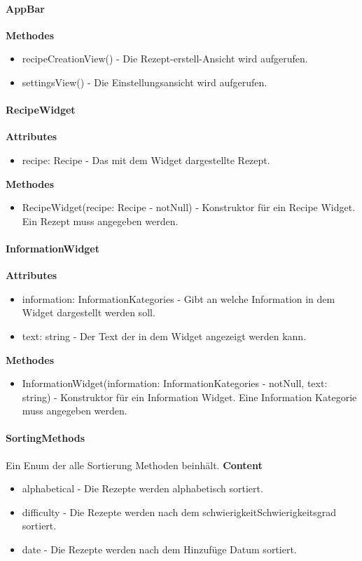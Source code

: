\documentclass[parskip=full]{scrartcl}
\begin{document}
\paragraph{AppBar}
\textbf{Methodes}
\begin{itemize}
    \item recipeCreationView() - Die Rezept-erstell-Ansicht wird aufgerufen.
    \item settingsView() - Die Einstellungsansicht wird aufgerufen.
\end{itemize}

\paragraph{RecipeWidget}
\textbf{Attributes}
\begin{itemize}
    \item recipe: Recipe - Das mit dem Widget dargestellte Rezept.
\end{itemize}
\textbf{Methodes}
\begin{itemize}
    \item RecipeWidget(recipe: Recipe - notNull) - Konstruktor für ein Recipe Widget. Ein Rezept muss angegeben werden.
\end{itemize}

\paragraph{InformationWidget}
\textbf{Attributes}
\begin{itemize}
    \item information: InformationKategories - Gibt an welche Information in dem Widget dargestellt werden soll.
    \item text: string - Der Text der in dem Widget angezeigt werden kann.
\end{itemize}

\textbf{Methodes}
\begin{itemize}
    \item InformationWidget(information: InformationKategories - notNull, text: string) - Konstruktor für ein Information Widget. Eine Information Kategorie muss angegeben werden.
\end{itemize}

\paragraph{SortingMethods}
Ein Enum der alle Sortierung Methoden beinhält.
\textbf{Content}
\begin{itemize}
    \item  alphabetical - Die Rezepte werden alphabetisch sortiert.
    \item  difficulty - Die Rezepte werden nach dem \gls{schwierigkeit}{Schwierigkeitsgrad} sortiert.
    \item  date - Die Rezepte werden nach dem Hinzufüge Datum sortiert.
\end{itemize}
\end{document}
